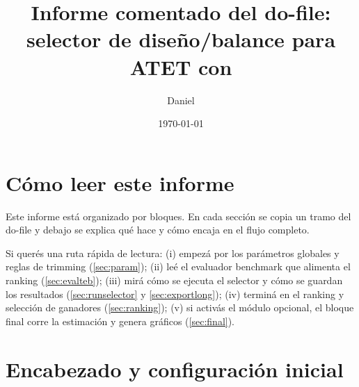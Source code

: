 \documentclass[12pt]{article}
\title{Informe comentado del do-file: selector de diseño/balance para ATET con \ttt{teffects ipwra}}
\author{Daniel}
\date{\today}
\begin{document}
\maketitle
\tableofcontents

\section{Cómo leer este informe}
Este informe está organizado por bloques. En cada sección se copia un tramo del do-file y debajo se explica qué hace y cómo encaja en el flujo completo.

Si querés una ruta rápida de lectura:
(i) empezá por los parámetros globales y reglas de trimming (\ref{sec:param});
(ii) leé el evaluador benchmark que alimenta el ranking (\ref{sec:evalteb});
(iii) mirá cómo se ejecuta el selector y cómo se guardan los resultados (\ref{sec:runselector} y \ref{sec:exportlong});
(iv) terminá en el ranking y selección de ganadores (\ref{sec:ranking});
(v) si activás el módulo opcional, el bloque final corre la estimación y genera gráficos (\ref{sec:final}).

\section{Encabezado y configuración inicial}\label{sec:introcode}
\end{document}
